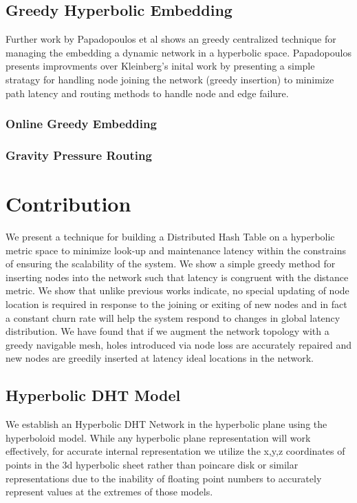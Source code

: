 \subsection{Greedy Hyperbolic Embedding}
Further work by Papadopoulos et al\cite{papadopoulos2010greedy} shows an greedy centralized technique for managing the embedding a dynamic network in a hyperbolic space.
Papadopoulos presents improvments over Kleinberg's inital work by presenting a simple stratagy for handling node joining the network (greedy insertion) to minimize path latency and routing methods to handle node and edge failure.

\subsubsection{Online Greedy Embedding}

\subsubsection{Gravity Pressure Routing}



\section{Contribution}


We present a technique for building a Distributed Hash Table on a hyperbolic metric space to minimize  look-up and maintenance latency within the constrains of ensuring the scalability of the system.
We show a simple greedy method for inserting nodes into the network such that latency is congruent 
 with the distance metric.
 We show that unlike previous works indicate, no special updating of node location is required in response to the joining or exiting of new nodes and in fact a constant churn rate will help the system respond to changes in global latency distribution.
We have found that if we augment the network topology with a greedy navigable mesh, holes introduced via node loss are accurately repaired and new nodes are greedily inserted at latency ideal locations in the network.


\subsection{Hyperbolic DHT Model}

We establish an Hyperbolic DHT Network in the hyperbolic plane using the hyperboloid model. While any hyperbolic plane representation will work effectively, for accurate internal representation we utilize the x,y,z coordinates of points in the 3d hyperbolic sheet rather than poincare disk or similar representations due to the inability of floating point numbers to accurately represent values at the extremes of those models.

